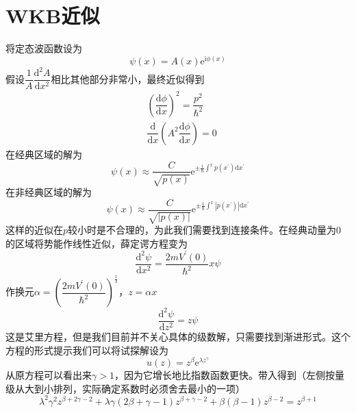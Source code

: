 \documentclass[12pt, a4paper, oneside]{ctexart}
\begin{document}
	\section{WKB近似}
	将定态波函数设为
	\begin{equation}
		\psi(x)=A(x)\mathrm{e}^{\mathrm{i}\phi(x)}
	\end{equation}
	\quad\quad 假设$\dfrac{1}{A}\dfrac{\mathrm{d}^{2}A}{\mathrm{d}x^{2}}$相比其他部分非常小，最终近似得到
	\begin{align}
		&\left(\dfrac{\mathrm{d}\phi}{\mathrm{d}x}\right)^{2}=\dfrac{p^{2}}{\hbar^{2}}\\
		&\dfrac{\mathrm{d}}{\mathrm{d}x}\left(A^{2}\dfrac{\mathrm{d}\phi}{\mathrm{d}x}\right)=0
	\end{align}
	\quad\quad 在经典区域的解为
	\begin{equation}
		\psi(x)\approx\dfrac{C}{\sqrt{p(x)}}\mathrm{e}^{\pm\frac{\mathrm{i}}{\hbar}\int^{x}p(x^{\prime})\mathrm{d}x^{\prime}}
	\end{equation}
	\quad\quad 在非经典区域的解为
	\begin{equation}
		\psi(x)\approx\dfrac{C}{\sqrt{\left|p(x)\right|}}\mathrm{e}^{\pm\frac{1}{\hbar}\int^{x}\left|p(x^{\prime})\right|\mathrm{d}x^{\prime}}
	\end{equation}
	\quad\quad 这样的近似在$p$较小时是不合理的，为此我们需要找到连接条件。在经典动量为$0$的区域将势能作线性近似，薛定谔方程变为
	\begin{equation}
		\dfrac{\mathrm{d}^{2}\psi}{\mathrm{d}x^{2}}=\dfrac{2mV^{\prime}(0)}{\hbar^{2}}x\psi
	\end{equation}
	\quad\quad 作换元$\alpha=\left(\dfrac{2mV^{\prime}(0)}{\hbar^{2}}\right)^{\frac{1}{3}}$，$z=\alpha x$
	\begin{equation}
		\dfrac{\mathrm{d}^{2}\psi}{\mathrm{d}z^{2}}=z\psi
	\end{equation}
	\quad\quad 这是艾里方程，但是我们目前并不关心具体的级数解，只需要找到渐进形式。这个方程的形式提示我们可以将试探解设为
	\begin{equation}
		u(z)=z^{\beta}\mathrm{e}^{\lambda z^{\gamma}}
	\end{equation}
	\quad\quad 从原方程可以看出来$\gamma>1$，因为它增长地比指数函数更快。带入得到（左侧按量级从大到小排列，实际确定系数时必须舍去最小的一项）
	\begin{equation}
		\lambda^{2}\gamma^{2}z^{\beta+2\gamma-2}+\lambda\gamma\left(2\beta+\gamma-1\right)z^{\beta+\gamma-2}+\beta\left(\beta-1\right)z^{\beta-2}=z^{\beta+1}
	\end{equation}
\end{document}
